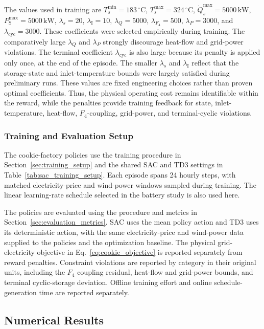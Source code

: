 \documentclass[12pt]{article}
\begin{document}
The values used in training are $T_s^{\min}=183\,{}^\circ\mathrm C$,
$T_s^{\max}=324\,{}^\circ\mathrm C$,
$\dot Q_s^{\max}=5000\,\mathrm{kW}$,
$P_{\mathrm S}^{\max}=5000\,\mathrm{kW}$,
$\lambda_s=20$, $\lambda_{\mathrm I}=10$, $\lambda_Q=5000$,
$\lambda_{F_4}=500$, $\lambda_P=3000$, and
$\lambda_{\mathrm{cyc}}=3000$. These coefficients were selected empirically
during training. The comparatively large
$\lambda_Q$ and $\lambda_P$ strongly discourage heat-flow and grid-power
violations. The terminal coefficient $\lambda_{\mathrm{cyc}}$ is also large
because its penalty is applied only once, at the end of the episode. The smaller $\lambda_s$ and
$\lambda_{\mathrm I}$ reflect that the storage-state and inlet-temperature
bounds were largely satisfied during preliminary runs. These values are fixed
engineering choices rather than proven optimal coefficients. Thus, the physical
operating cost remains identifiable within the reward, while the
penalties provide training feedback for state, inlet-temperature, heat-flow,
$F_4$-coupling, grid-power, and terminal-cyclic violations.

\subsubsection{Training and Evaluation Setup}

The cookie-factory policies use the training procedure in Section~\ref{sec:training_setup} and the shared SAC and TD3 settings in Table~\ref{tab:sac_training_setup}. Each episode spans 24 hourly steps, with matched electricity-price and wind-power windows sampled during training. The linear learning-rate schedule selected in the battery study is also used here.

The policies are evaluated using the procedure and metrics in Section~\ref{sec:evaluation_metrics}. SAC uses the mean policy action and TD3 uses its deterministic action, with the same electricity-price and wind-power data supplied to the policies and the optimization baseline. The physical grid-electricity objective in Eq.~\eqref{eq:cookie_objective} is reported separately from reward penalties. Constraint violations are reported by category in their original units, including the $F_4$ coupling residual, heat-flow and grid-power bounds, and terminal cyclic-storage deviation. Offline training effort and online schedule-generation time are reported separately.

\FloatBarrier
\subsection{Numerical Results}
\label{sec:cookie_results}
\end{document}
